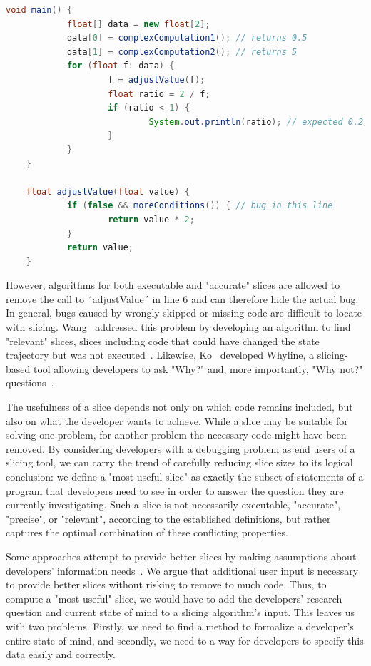 \begin{lstlisting}[float,caption={Code example for accurate slices.},stepnumber=2,numberfirstline=false,label=lst:sliceAccurate,language=Java]
	void main() {
			float[] data = new float[2];
			data[0] = complexComputation1(); // returns 0.5
			data[1] = complexComputation2(); // returns 5
			for (float f: data) {
					f = adjustValue(f);
					float ratio = 2 / f;
					if (ratio < 1) {
							System.out.println(ratio); // expected 0.2, got 0.4
					}
			}
	}

	float adjustValue(float value) {
			if (false && moreConditions()) { // bug in this line
					return value * 2;
			}
			return value;
	}
\end{lstlisting}

However, algorithms for both executable and "accurate" slices are allowed to remove the call to ´adjustValue´ in line 6 and can therefore hide the actual bug.
In general, bugs caused by wrongly skipped or missing code are difficult to locate with slicing.
Wang \etal\ addressed this problem by developing an algorithm to find "relevant" slices, slices including code that could have changed the state trajectory but was not executed~\cite{wang08:dynamic_slicing_on_java}.
Likewise, Ko \etal\ developed Whyline, a slicing-based tool allowing developers to ask "Why?" and, more importantly, "Why not?" questions~\cite{ko08:debugging_reinvented_asking}.

The usefulness of a slice depends not only on which code remains included, but also on what the developer wants to achieve.
While a slice may be suitable for solving one problem, for another problem the necessary code might have been removed.
By considering developers with a debugging problem as end users of a slicing tool, we can carry the trend of carefully reducing slice sizes to its logical conclusion: we define a "most useful slice" as exactly the subset of statements of a program that developers need to see in order to answer the question they are currently investigating.
Such a slice is not necessarily executable, "accurate", "precise", or "relevant", according to the established definitions, but rather captures the optimal combination of these conflicting properties.

Some approaches attempt to provide better slices by making assumptions about developers' information needs~\cite{sridharan07:thin_slicing}.
We argue that additional user input is necessary to provide better slices without risking to remove to much code.
Thus, to compute a "most useful" slice, we would have to add the developers' research question and current state of mind to a slicing algorithm's input.
This leaves us with two problems.
Firstly, we need to find a method to formalize a developer's entire state of mind, and secondly, we need to a way for developers to specify this data easily and correctly.

